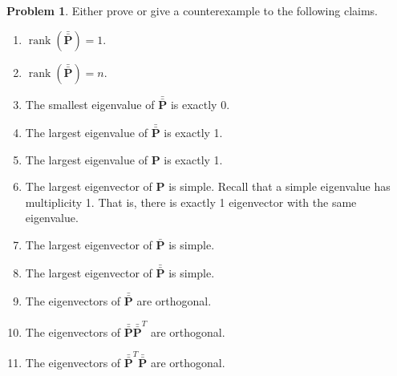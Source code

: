 \documentclass[10pt]{article}
\theoremstyle{definition}
\newtheorem{problem}{Problem}
\DeclareMathOperator{\rank}{rank}
\newcommand{\p}{\mathbf P}
\newcommand{\pb}{\bar {\p}}
\newcommand{\pbb}{\bar {\pb}}
\newcommand{\trans}[1]{{#1}^{T}}
\begin{document}
\newpage
\begin{problem}
    Either prove or give a counterexample to the following claims.
    \begin{enumerate}
        \item
            $\rank(\pbb) = 1$.
            \vspace{4.5in}
        \item
            $\rank(\pbb) = n$.
            \vspace{4.5in}

        \item
            The smallest eigenvalue of $\pbb$ is exactly 0.
            \vspace{3in}
        \item
            The largest eigenvalue of $\pbb$ is exactly 1.
            \vspace{3in}
        \item
            The largest eigenvalue of $\p$ is exactly 1.
            \vspace{3in}

        \item
            The largest eigenvector of $\p$ is simple.
            Recall that a simple eigenvalue has multiplicity 1.
            That is, there is exactly 1 eigenvector with the same eigenvalue.
            \vspace{3in}

        \item
            The largest eigenvector of $\pb$ is simple.
            \vspace{3in}

        \item
            The largest eigenvector of $\pbb$ is simple.
            \vspace{3in}

        \item
            The eigenvectors of $\pbb$ are orthogonal.
            \vspace{3in}

        \item
            The eigenvectors of $\pbb\trans\pbb$ are orthogonal.
            \vspace{3in}

        \item
            The eigenvectors of $\trans\pbb\pbb$ are orthogonal.
            \vspace{3in}
    \end{enumerate}
\end{problem}
\end{document}
